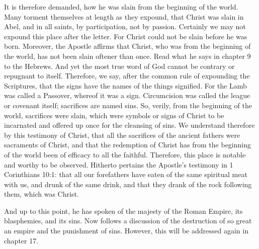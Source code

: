 It is therefore demanded, how he was slain from the beginning of the world. Many torment themselves at length as they expound, that Christ was slain in Abel, and in all saints, by participation, not by passion. Certainly we may not expound this place after the letter. For Christ could not be slain before he was born. Moreover, the Apostle affirms that Christ, who was from the beginning of the world, has not been slain oftener than once. Read what he says in chapter 9 to the Hebrews. And yet the most true word of God cannot be contrary or repugnant to itself. Therefore, we say, after the common rule of expounding the Scriptures, that the signs have the names of the things signified. For the Lamb was called a Passover, whereof it was a sign. Circumcision was called the league or covenant itself; sacrifices are named sins. So, verily, from the beginning of the world, sacrifices were slain, which were symbols or signs of Christ to be incarnated and offered up once for the cleansing of sins. We understand therefore by this testimony of Christ, that all the sacrifices of the ancient fathers were sacraments of Christ, and that the redemption of Christ has from the beginning of the world been of efficacy to all the faithful. Therefore, this place is notable and worthy to be observed. Hitherto pertains the Apostle’s testimony in 1 Corinthians 10:1: that all our forefathers have eaten of the same spiritual meat with us, and drunk of the same drink, and that they drank of the rock following them, which was Christ.

And up to this point, he has spoken of the majesty of the Roman Empire, its blasphemies, and its sins. Now follows a discussion of the destruction of so great an empire and the punishment of sins. However, this will be addressed again in chapter 17.

